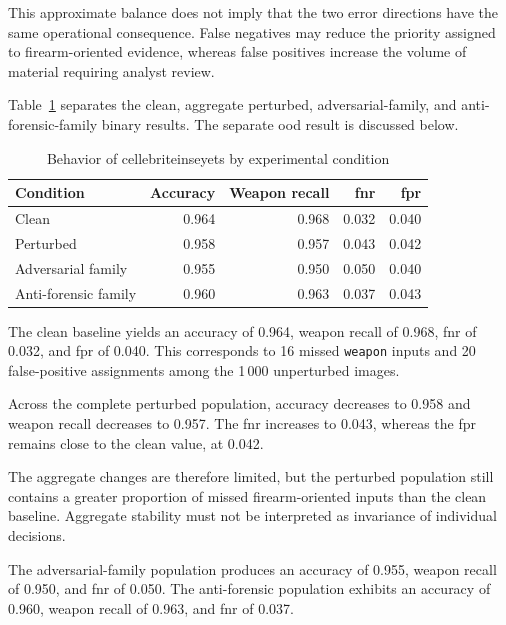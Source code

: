This approximate balance does not imply that the two error directions have the
same operational consequence. False negatives may reduce the priority assigned
to firearm-oriented evidence, whereas false positives increase the volume of
material requiring analyst review.

Table~\ref{tab:results-cellebrite-condition-metrics} separates the clean,
aggregate perturbed, adversarial-family, and anti-forensic-family binary
results. The separate \gls{ood} result is discussed below.

\begin{table}[H]
\centering
\caption{Behavior of \gls{cellebriteinseyets} by experimental condition}
\label{tab:results-cellebrite-condition-metrics}
\small
\renewcommand{\arraystretch}{1.15}
\begin{tabular}{@{}lrrrr@{}}
\toprule
\textbf{Condition} &
\textbf{Accuracy} &
\textbf{Weapon recall} &
\textbf{\gls{fnr}} &
\textbf{\gls{fpr}} \\
\midrule

Clean
&
0.964
&
0.968
&
0.032
&
0.040 \\

Perturbed
&
0.958
&
0.957
&
0.043
&
0.042 \\

Adversarial family
&
0.955
&
0.950
&
0.050
&
0.040 \\

Anti-forensic family
&
0.960
&
0.963
&
0.037
&
0.043 \\

\bottomrule
\end{tabular}
\end{table}

The clean baseline yields an accuracy of 0.964, weapon recall of 0.968,
\gls{fnr} of 0.032, and \gls{fpr} of 0.040. This corresponds to 16 missed
\texttt{weapon} inputs and 20 false-positive assignments among the 1\,000
unperturbed images.

Across the complete perturbed population, accuracy decreases to 0.958 and
weapon recall decreases to 0.957. The \gls{fnr} increases to 0.043, whereas
the \gls{fpr} remains close to the clean value, at 0.042.

The aggregate changes are therefore limited, but the perturbed population still
contains a greater proportion of missed firearm-oriented inputs than the clean
baseline. Aggregate stability must not be interpreted as invariance of
individual decisions.

The adversarial-family population produces an accuracy of 0.955, weapon recall
of 0.950, and \gls{fnr} of 0.050. The anti-forensic population exhibits an
accuracy of 0.960, weapon recall of 0.963, and \gls{fnr} of 0.037.

